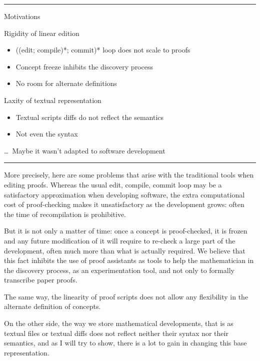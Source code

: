 \documentclass[ignorenonframetext,red]{beamer}
\begin{document}
\hrule
\begin{frame}{Motivations}
  \begin{block}{Rigidity of linear edition}
    \begin{itemize}
    \item ((edit; compile)*; commit)* loop does not scale to proofs
    \item Concept freeze inhibits the discovery process
    \item No room for alternate definitions
    \end{itemize}
  \end{block}
  \pause
  \begin{block}{Laxity of textual representation}
    \begin{itemize}
    \item Textual scripts \textsf{diff}s do not reflect the semantics
    \item Not even the syntax
    \end{itemize}
  \end{block}
  \vspace{2em}
  \pause
  {\tiny \ldots\ Maybe it wasn't adapted to software development}
\end{frame}
\hrule

More precisely, here are some problems that arise with the traditional
tools when editing proofs. Whereas the usual edit, compile, commit
loop may be a satisfactory approximation when developing software, the
extra computational cost of proof-checking makes it unsatisfactory as
the development grows: often the time of recompilation is prohibitive.

But it is not only a matter of time: once a concept is proof-checked,
it is frozen and any future modification of it will require to
re-check a large part of the development, often much more than what is
actually required. We believe that this fact inhibits the use of proof
assistants as tools to help the mathematician in the discovery
process, as an experimentation tool, and not only to formally
transcribe paper proofs.

The same way, the linearity of proof scripts does not allow any
flexibility in the alternate definition of concepts.

On the other side, the way we store mathematical developments, that is
as textual files or textual diffs does not reflect neither their
syntax nor their semantics, and as I will try to show, there is a lot
to gain in changing this base representation.
\end{document}
